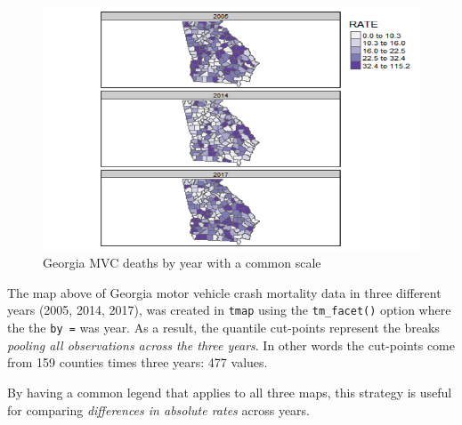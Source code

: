 \documentclass[
]{book}
\begin{document}
\begin{figure}
\centering
\includegraphics{images/time-series-ga-same-cuts.png}
\caption{\label{fig:unnamed-chunk-7}Georgia MVC deaths by year with a common scale}
\end{figure}

The map above of Georgia motor vehicle crash mortality data in three different years (2005, 2014, 2017), was created in \texttt{tmap} using the \texttt{tm\_facet()} option where the the \texttt{by\ =} was year. As a result, the quantile cut-points represent the breaks \emph{pooling all observations across the three years}. In other words the cut-points come from 159 counties times three years: 477 values.

By having a common legend that applies to all three maps, this strategy is useful for comparing \emph{differences in absolute rates} across years.
\end{document}

